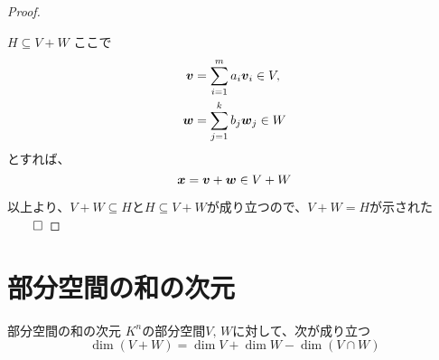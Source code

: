 \documentclass[../../../topic_linear-algebra]{subfiles}
\begin{document}
\begin{proof}
\begin{subpattern}{$H \subseteq V + W$}
    ここで
    \begin{align*}
      \vb*{v} & = \sum_{i=1}^m a_i \vb*{v}_i \in V, \\
      \vb*{w} & = \sum_{j=1}^k b_j \vb*{w}_j \in W
    \end{align*}
    とすれば、
    \begin{equation*}
      \vb*{x} = \vb*{v} + \vb*{w} \in V + W
    \end{equation*}
  \end{subpattern}

  \br

  以上より、$V+W \subseteq H$と$H \subseteq V + W$が成り立つので、$V + W = H$が示された $\qed$
\end{proof}

\sectionline
\section{部分空間の和の次元}

\begin{theorem}{部分空間の和の次元}
  $K^n$の部分空間$V, \, W$に対して、次が成り立つ
  \begin{equation*}
    \dim(V + W) = \dim V + \dim W - \dim(V \cap W)
  \end{equation*}
\end{theorem}
\end{document}

